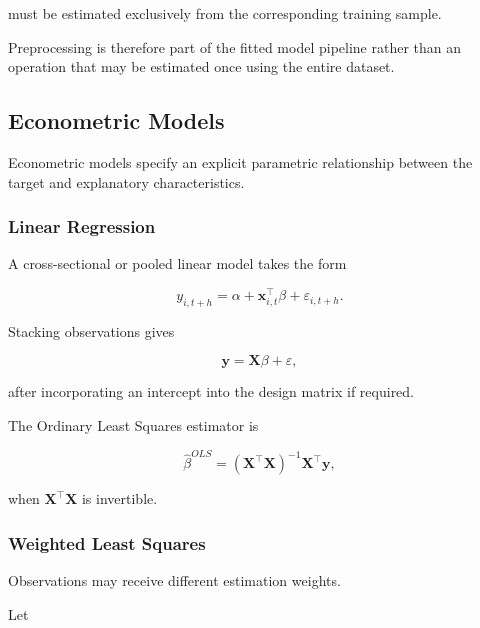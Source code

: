 \documentclass[11pt,a4paper]{article}
\begin{document}
must be estimated exclusively from the corresponding training sample.

Preprocessing is therefore part of the fitted model pipeline rather than an
operation that may be estimated once using the entire dataset.


\subsection{Econometric Models}
\label{subsec:econometric_models}

Econometric models specify an explicit parametric relationship between the
target and explanatory characteristics.


\subsubsection{Linear Regression}

A cross-sectional or pooled linear model takes the form

\begin{equation}
\boxed{
y_{i,t+h}
=
\alpha
+
\mathbf{x}_{i,t}^{\top}\beta
+
\varepsilon_{i,t+h}.
}
\end{equation}

Stacking observations gives

\begin{equation}
\mathbf{y}
=
\mathbf{X}\beta
+
\varepsilon,
\end{equation}

after incorporating an intercept into the design matrix if required.

The Ordinary Least Squares estimator is

\begin{equation}
\boxed{
\widehat{\beta}^{OLS}
=
\left(
\mathbf{X}^{\top}\mathbf{X}
\right)^{-1}
\mathbf{X}^{\top}\mathbf{y},
}
\end{equation}

when $\mathbf{X}^{\top}\mathbf{X}$ is invertible.


\subsubsection{Weighted Least Squares}

Observations may receive different estimation weights.

Let
\end{document}
